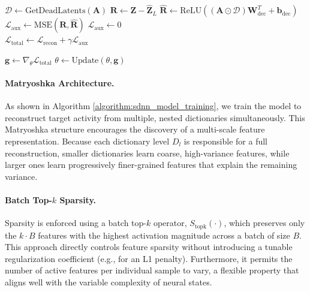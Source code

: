 \begin{algorithm}[h!]
\begin{algorithmic}[1]
    \Statex {}
    \State $\mathcal{D} \gets \text{GetDeadLatents}(\mathbf{A})$
     
        \State $\mathbf{R} \gets \mathbf{Z} - \hat{\mathbf{Z}}_L$ 
        \State $\hat{\mathbf{R}} \gets \text{ReLU}((\mathbf{A} \odot \mathcal{D}) \mathbf{W}_{\text{dec}}^T + \mathbf{b}_{\text{dec}})$ 
        \State $\mathcal{L}_{\text{aux}} \gets \text{MSE}(\mathbf{R}, \hat{\mathbf{R}})$ 
    \Else
        \State $\mathcal{L}_{\text{aux}} \gets 0$
    \EndIf
    \\
    \State $\mathcal{L}_{\text{total}} \gets \mathcal{L}_{\text{recon}} + \gamma \mathcal{L}_{\text{aux}}$ 

    \Statex {}
    \State $\mathbf{g} \gets \nabla_{\theta} \mathcal{L}_{\text{total}}$ 
    \State $\theta \gets \text{Update}(\theta, \mathbf{g})$ 
\EndProcedure
\end{algorithmic}
\end{algorithm}

\paragraph{Matryoshka Architecture.}
As shown in Algorithm \ref{algorithm:sdnn_model_training}, we train the model to reconstruct target activity from multiple, nested dictionaries simultaneously. This Matryoshka structure \cite{bussmann_2025_msae} encourages the discovery of a multi-scale feature representation. Because each dictionary level $D_l$ is responsible for a full reconstruction, smaller dictionaries learn coarse, high-variance features, while larger ones learn progressively finer-grained features that explain the remaining variance.

\paragraph{Batch Top-$k$ Sparsity.}
Sparsity is enforced using a batch top-$k$ operator, $S_{\text{topk}}(\cdot)$, which preserves only the $k \cdot B$ features with the highest activation magnitude across a batch of size $B$. This approach directly controls feature sparsity without introducing a tunable regularization coefficient (e.g., for an L1 penalty). Furthermore, it permits the number of active features per individual sample to vary, a flexible property that aligns well with the variable complexity of neural states.

